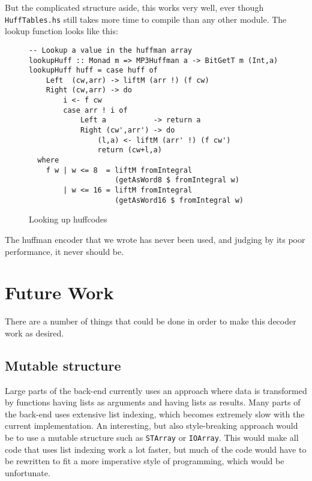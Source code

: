 \documentclass[a4paper,12pt]{article}
\begin{document}
        But the complicated structure aside, this works very well, ever though
        \texttt{HuffTables.hs} still takes more time to compile than any other
        module.  The lookup function looks like this:
\begin{figure}[h]
  \begin{center}
        \begin{lstlisting}
-- Lookup a value in the huffman array
lookupHuff :: Monad m => MP3Huffman a -> BitGetT m (Int,a)
lookupHuff huff = case huff of
    Left  (cw,arr) -> liftM (arr !) (f cw)
    Right (cw,arr) -> do
        i <- f cw
        case arr ! i of
            Left a           -> return a
            Right (cw',arr') -> do
                (l,a) <- liftM (arr' !) (f cw')
                return (cw+l,a)
  where
    f w | w <= 8  = liftM fromIntegral
                    (getAsWord8 $ fromIntegral w)
        | w <= 16 = liftM fromIntegral
                    (getAsWord16 $ fromIntegral w)
        \end{lstlisting}
    \caption{Looking up huffcodes}\label{fig:lookuphuff}
  \end{center}
\end{figure}

        The huffman encoder that we wrote has never been used, and judging by
        its poor performance, it never should be.

\section{Future Work}
    There are a number of things that could be done in order to make this
    decoder work as desired.

    \subsection{Mutable structure}
        Large parts of the back-end currently uses an approach where data is
        transformed by functions having lists as arguments and having lists as
        results. Many parts of the back-end uses extensive list indexing, which
        becomes extremely slow with the current implementation. An interesting,
        but also style-breaking approach would be to use a mutable structure
        such as \texttt{STArray} or \texttt{IOArray}. This would make all code
        that uses list indexing work a lot faster, but much of the code would
        have to be rewritten to fit a more imperative style of programming,
        which would be unfortunate.
\end{document}
